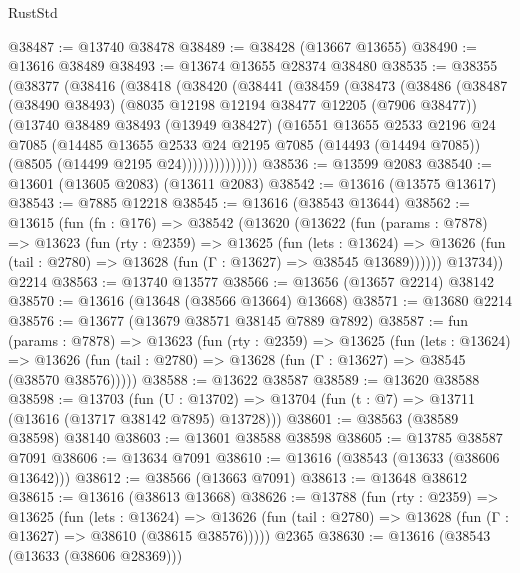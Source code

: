 \begin{lexlean}{RustStd}
\begin{coremodule}
@38487 := @13740 @38478
@38489 := @38428 (@13667 @13655)
@38490 := @13616 @38489
@38493 := @13674 @13655 @28374 @38480
@38535 := @38355
    (@38377
      (@38416
        (@38418
          (@38420
            (@38441
              (@38459
                (@38473
                  (@38486
                    (@38487
                      (@38490 @38493)
                      (@8035 @12198 @12194 @38477 @12205 (@7906 @38477))
                      (@13740
                        @38489
                        @38493
                        (@13949 @38427)
                        (@16551
                          @13655
                          @2533
                          @2196
                          @24
                          @7085
                          (@14485
                            @13655
                            @2533
                            @24
                            @2195
                            @7085
                            (@14493 (@14494 @7085))
                            (@8505 (@14499 @2195 @24))))))))))))))
@38536 := @13599 @2083
@38540 := @13601 (@13605 @2083) (@13611 @2083)
@38542 := @13616 (@13575 @13617)
@38543 := @7885 @12218
@38545 := @13616 (@38543 @13644)
@38562 := @13615
    (fun (fn : @176) =>
    @38542
      (@13620
        (@13622
          (fun (params : @7878) =>
          @13623
            (fun (rty : @2359) =>
            @13625
              (fun (lets : @13624) =>
              @13626 (fun (tail : @2780) => @13628 (fun (Γ : @13627) => @38545 @13689))))))
        @13734))
    @2214
@38563 := @13740 @13577
@38566 := @13656 (@13657 @2214) @38142
@38570 := @13616 (@13648 (@38566 @13664) @13668)
@38571 := @13680 @2214
@38576 := @13677 (@13679 @38571 @38145 @7889 @7892)
@38587 := fun (params : @7878) =>
  @13623
    (fun (rty : @2359) =>
    @13625
      (fun (lets : @13624) =>
      @13626 (fun (tail : @2780) => @13628 (fun (Γ : @13627) => @38545 (@38570 @38576)))))
@38588 := @13622 @38587
@38589 := @13620 @38588
@38598 := @13703
    (fun (U : @13702) => @13704 (fun (t : @7) => @13711 (@13616 (@13717 @38142 @7895) @13728)))
@38601 := @38563 (@38589 @38598) @38140
@38603 := @13601 @38588 @38598
@38605 := @13785 @38587 @7091
@38606 := @13634 @7091
@38610 := @13616 (@38543 (@13633 (@38606 @13642)))
@38612 := @38566 (@13663 @7091)
@38613 := @13648 @38612
@38615 := @13616 (@38613 @13668)
@38626 := @13788
    (fun (rty : @2359) =>
    @13625
      (fun (lets : @13624) =>
      @13626 (fun (tail : @2780) => @13628 (fun (Γ : @13627) => @38610 (@38615 @38576)))))
    @2365
@38630 := @13616 (@38543 (@13633 (@38606 @28369)))

\end{coremodule}
\end{lexlean}
